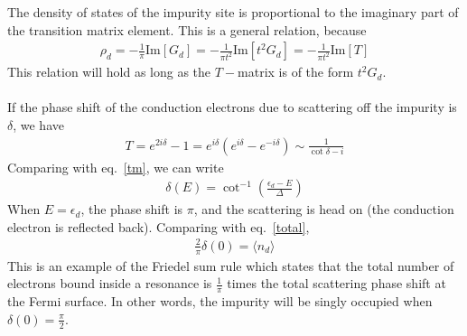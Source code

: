 \documentclass[twoside]{report}
\numberwithin{equation}{section}
\begin{document}
The density of states of the impurity site is proportional to the imaginary part of the transition matrix element.
This is a general relation, because
\begin{equation}\begin{aligned}
	\rho_d = -\frac{1}{\pi}\text{Im}\left[G_d\right] = -\frac{1}{\pi t^2}\text{Im}\left[t^2 G_d\right] = -\frac{1}{\pi t^2}\text{Im}\left[T\right]
\end{aligned}\end{equation}
This relation will hold as long as the \(T-\)matrix is of the form \(t^2 G_d\).
\\\\
If the phase shift of the conduction electrons due to scattering off the impurity is \(\delta\), we have
\begin{equation}\begin{aligned}
	T = e^{2i\delta} - 1 = e^{i\delta}\left(e^{i\delta} - e^{-i\delta}\right) \sim \frac{1}{\cot \delta - i}
\end{aligned}\end{equation}
Comparing with eq.~\ref{tm}, we can write
\begin{equation}\begin{aligned}
	\label{phaseshift}
	\delta(E) = \cot^{-1}\left(\frac{\epsilon_d - E}{\Delta}\right)
\end{aligned}\end{equation}
When \(E = \epsilon_d\), the phase shift is \(\pi\), and the scattering is head on (the conduction electron is reflected back).
Comparing with eq.~\ref{total},
\begin{equation}\begin{aligned}
	\frac{2}{\pi}\delta(0) = \langle  n_d\rangle
\end{aligned}\end{equation}
This is an example of the Friedel sum rule which states that the total number of electrons bound inside a resonance is \(\frac{1}{\pi}\) times the total scattering phase shift at the Fermi surface.
In other words, the impurity will be singly occupied when \(\delta(0) = \frac{\pi}{2}\).
\end{document}
